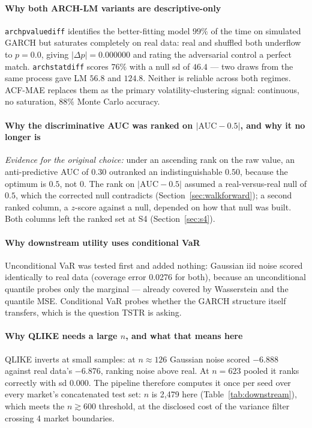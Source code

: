 \documentclass[11pt,a4paper]{article}
\makeatletter
\DeclareRobustCommand{\_}{\ifmmode\nfss@text{\textunderscore}\else\textunderscore\allowbreak\fi}
\makeatother
\begin{document}
\paragraph{Why both ARCH-LM variants are descriptive-only} \texttt{arch\_pvalue\_diff} identifies the better-fitting model $99\%$ of the time on simulated GARCH but saturates completely on real data: real and shuffled both underflow to $p=0.0$, giving $|\Delta p|=0.000000$ and rating the adversarial control a perfect match. \texttt{arch\_stat\_diff} scores $76\%$ with a null sd of $46.4$ --- two draws from the same process gave LM $56.8$ and $124.8$. Neither is reliable across both regimes. ACF-MAE replaces them as the primary volatility-clustering signal: continuous, no saturation, $88\%$ Monte Carlo accuracy.

\paragraph{Why the discriminative AUC was ranked on $|\text{AUC}-0.5|$, and why it no longer is} \textit{Evidence for the original choice:} under an ascending rank on the raw value, an anti-predictive AUC of $0.30$ outranked an indistinguishable $0.50$, because the optimum is $0.5$, not $0$. The rank on $|\text{AUC}-0.5|$ assumed a real-versus-real null of $0.5$, which the corrected null contradicts (Section~\ref{sec:walkforward}); a second ranked column, a $z$-score against a null, depended on how that null was built. Both columns left the ranked set at S4 (Section~\ref{sec:s4}).

\paragraph{Why downstream utility uses conditional VaR} Unconditional VaR was tested first and added nothing: Gaussian iid noise scored identically to real data (coverage error 0.0276 for both), because an unconditional quantile probes only the marginal --- already covered by Wasserstein and the quantile MSE. Conditional VaR probes whether the GARCH structure itself transfers, which is the question TSTR is asking.

\paragraph{Why QLIKE needs a large $n$, and what that means here} QLIKE inverts at small samples: at $n\approx126$ Gaussian noise scored $-6.888$ against real data's $-6.876$, ranking noise above real. At $n=623$ pooled it ranks correctly with sd $0.000$. The pipeline therefore computes it once per seed over every market's concatenated test set: $n$ is 2,479 here (Table~\ref{tab:downstream}), which meets the $n\gtrsim600$ threshold, at the disclosed cost of the variance filter crossing 4 market boundaries.
\end{document}
